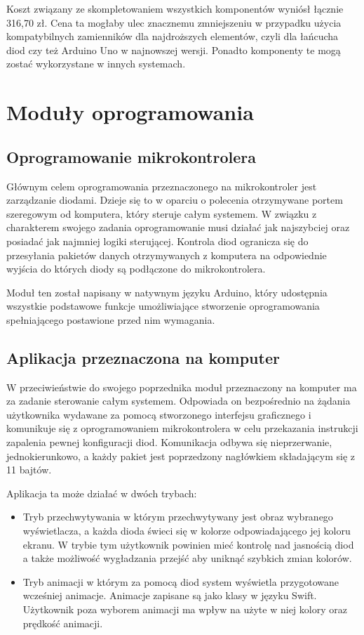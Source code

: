 \documentclass[12pt]{report}
\begin{document}
Koszt związany ze skompletowaniem wszystkich komponentów wyniósł łącznie 316,70 zł. Cena ta mogłaby ulec znacznemu zmniejszeniu w przypadku użycia kompatybilnych zamienników dla najdroższych elementów, czyli dla łańcucha diod czy też Arduino Uno w najnowszej wersji. Ponadto komponenty te mogą zostać wykorzystane w innych systemach.


\section{Moduły oprogramowania}

\subsection{Oprogramowanie mikrokontrolera}

Głównym celem oprogramowania przeznaczonego na mikrokontroler jest zarządza\-nie diodami. Dzieje się to w oparciu o polecenia otrzymywane portem szeregowym od komputera, który steruje całym systemem. W związku z charakterem swojego zadania oprogramowanie musi działać jak najszybciej oraz posiadać jak najmniej logiki sterującej. Kontrola diod ogranicza się do przesyłania pakietów danych otrzymywanych z komputera na odpowiednie wyjścia do których diody są podłączone do mikrokontrolera. 

Moduł ten został napisany w natywnym języku Arduino, który udostępnia wszystkie podstawowe funkcje umożliwiające stworzenie oprogramowania spełniającego postawione przed nim wymagania.

\subsection{Aplikacja przeznaczona na komputer}

W przeciwieństwie do swojego poprzednika moduł przeznaczony na komputer ma za zadanie sterowanie całym systemem. Odpowiada on bezpośrednio na żądania użytkownika wydawane za pomocą stworzonego interfejsu graficznego i komunikuje się z oprogramowaniem mikrokontrolera w celu przekazania instrukcji zapalenia pewnej konfiguracji diod. Komunikacja odbywa się nieprzerwanie, jednokierunkowo, a każdy pakiet jest poprzedzony nagłówkiem składającym się z 11 bajtów.

Aplikacja ta może działać w dwóch trybach:

\begin{itemize}
	\item Tryb przechwytywania w którym przechwytywany jest obraz wybranego wyświetlacza, a każda dioda świeci się w kolorze odpowiadającego jej koloru ekranu. W trybie tym użytkownik powinien mieć kontrolę nad jasnością diod a także możliwość wygładzania przejść aby uniknąć szybkich zmian kolorów.
	\item Tryb animacji w którym za pomocą diod system wyświetla przygotowane wcześniej animacje. Animacje zapisane są jako klasy w języku Swift. Użytkownik poza wyborem animacji ma wpływ na użyte w niej kolory oraz prędkość animacji.
\end{itemize}
\end{document}
